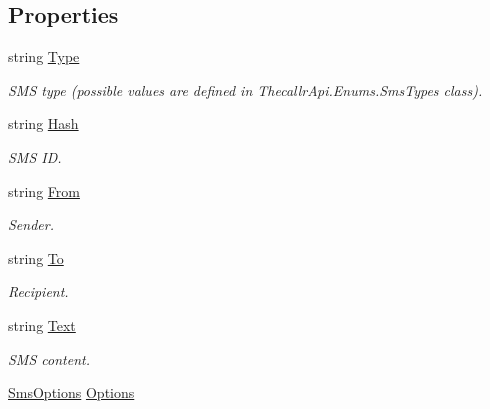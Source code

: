 \subsection*{Properties}
\begin{DoxyCompactItemize}
\item 
string \hyperlink{class_thecallr_api_1_1_objects_1_1_sms_1_1_sms_a3514d7f34644b71999f47370e1679e6e}{Type}
\begin{DoxyCompactList}\small\item\em S\+M\+S type (possible values are defined in Thecallr\+Api.\+Enums.\+Sms\+Types class). \end{DoxyCompactList}\item 
string \hyperlink{class_thecallr_api_1_1_objects_1_1_sms_1_1_sms_afc7d55f40da0c17ad7a209af28e5bb23}{Hash}
\begin{DoxyCompactList}\small\item\em S\+M\+S I\+D. \end{DoxyCompactList}\item 
string \hyperlink{class_thecallr_api_1_1_objects_1_1_sms_1_1_sms_a9d38d772952e23c3bfd88913b181ee06}{From}
\begin{DoxyCompactList}\small\item\em Sender. \end{DoxyCompactList}\item 
string \hyperlink{class_thecallr_api_1_1_objects_1_1_sms_1_1_sms_aeb6c4f4712263abde25201997ca9952e}{To}
\begin{DoxyCompactList}\small\item\em Recipient. \end{DoxyCompactList}\item 
string \hyperlink{class_thecallr_api_1_1_objects_1_1_sms_1_1_sms_a64da1b9a01370e919f60889bf2e057eb}{Text}
\begin{DoxyCompactList}\small\item\em S\+M\+S content. \end{DoxyCompactList}\item 
\hyperlink{class_thecallr_api_1_1_objects_1_1_sms_1_1_sms_options}{Sms\+Options} \hyperlink{class_thecallr_api_1_1_objects_1_1_sms_1_1_sms_a8f9ac62227f9244db992316c245e703b}{Options}

\end{DoxyCompactItemize}
